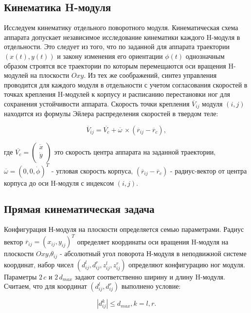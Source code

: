 \subsection{Кинематика H-модуля}
Исследуем кинематику отдельного поворотного модуля. Кинематическая схема аппарата допускает независимое исследование кинематики каждого H-модуля в отдельности. Это следует из того, что по заданной для аппарата траектории $(x(t),y(t))$ и закону изменения его ориентации $\phi(t)$ однозначным образом строятся все траектории по которым перемещаются оси вращения H-модулей на плоскости $Oxy$. Из тех же соображений, синтез управления проводится для каждого модуля в отдельности с учетом согласования скоростей в точках крепления H-модулей к корпусу и расписанию перестановки ног для сохранения устойчивости аппарата.
Скорость точки крепления $\overline{V}_{ij}$ модуля $(i,j)$ находится из формулы Эйлера распределения скоростей в твердом теле:

\begin{equation}
\label{v_ij}
	\overline{V}_{ij} = \overline{V_c}+\overline{\omega}\,\times(\overline{r}_{ij}-\overline{r}_c),
\end{equation}

где $\overline{V_c} = \left(\begin{array}{c}\dot{x}\\\dot{y}\\\end{array}\right)$ это скорость центра аппарата на заданной траектории, $\overline\omega =(0,0,\dot\phi)^T$ - угловая скорость корпуса, $(\overline{r}_{ij}-\overline{r}_c)$ - радиус-вектор от центра корпуса до оси H-модуля с индексом $(i,j)$.

\subsection{Прямая кинематическая задача}
Конфигурация Н-модуля на плоскости определяется семью параметрами. Радиус вектор $ \overline{r}_{ij} = (x_{ij},y_{ij})^T$ определяет координаты оси вращения H-модуля на плоскости $Oxy$,$\theta_{ij}$ - абсолютный угол поворота Н-модуля в неподвижной системе координат, набор чисел $(d^l_{ij},d^r_{ij},z^l_{ij},z^r_{ij})$ определяют конфигурацию ног модуля. Параметры $2\,c$  и $2\,d_{max}$ задают соответственно ширину и длину H-модуля. Считаем, что для координат $(d^l_{ij},d^r_{ij})$ выполнено условие:

\begin{equation}
	\label{d_constraint}
	|d^k_{ij}|\leq d_{max},k = l,r.
\end{equation}

